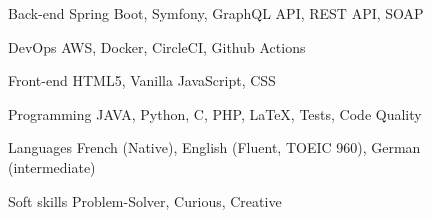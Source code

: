 

\begin{cvskills}

\cvskill
  {Back-end} %
  {Spring Boot, Symfony, GraphQL API, REST API, SOAP} %

  \cvskill
    {DevOps} %
    {AWS, Docker, CircleCI, Github Actions} %

  \cvskill
    {Front-end} %
    {HTML5, Vanilla JavaScript, CSS} %

  \cvskill
    {Programming} %
    {JAVA, Python, C, PHP, LaTeX, Tests, Code Quality} %

  \cvskill
    {Languages} %
    {French (Native), English (Fluent, TOEIC 960), German (intermediate)} %

  \cvskill
    {Soft skills} %
    {Problem-Solver, Curious, Creative} %

\end{cvskills}
